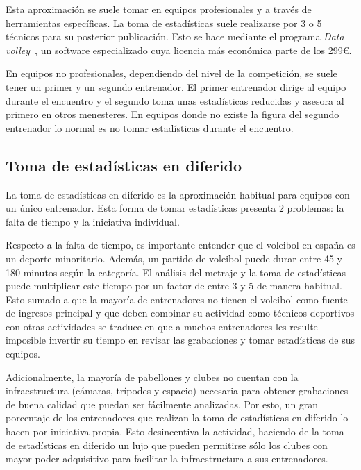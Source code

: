 \documentclass[12pt]{report} %
\begin{document}
    Esta aproximación se suele tomar en equipos profesionales y a través de
    herramientas específicas. La toma de estadísticas suele realizarse por 3 o
    5 técnicos para su posterior publicación. Esto se hace mediante el programa
    \textit{Data volley}~\cite{datavoley}, un software especializado cuya
    licencia más económica parte de los 299\euro. 

    En equipos no profesionales, dependiendo del nivel de la competición, se
    suele tener un primer y un segundo entrenador. El primer entrenador dirige
    al equipo durante el encuentro y el segundo toma unas estadísticas
    reducidas y asesora al primero en otros menesteres. En equipos donde no
    existe la figura del segundo entrenador lo normal es no tomar estadísticas
    durante el encuentro.

    \subsection{Toma de estadísticas en diferido}

    La toma de estadísticas en diferido es la aproximación habitual para
    equipos con un único entrenador. Esta forma de tomar estadísticas presenta
    2 problemas: la falta de tiempo y la iniciativa individual.

    Respecto a la falta de tiempo, es importante entender que el voleibol en
    españa es un deporte minoritario. Además, un partido de voleibol puede durar
    entre 45 y 180 minutos según la categoría. El análisis del metraje y la
    toma de estadísticas puede multiplicar este tiempo por un factor de entre 3
    y 5 de manera habitual. Esto sumado a que la mayoría de entrenadores no
    tienen el voleibol como fuente de ingresos principal y que deben combinar
    su actividad como técnicos deportivos con otras actividades se
    traduce en que a muchos entrenadores les resulte imposible invertir su
    tiempo en revisar las grabaciones y tomar estadísticas de sus equipos.

    Adicionalmente, la mayoría de pabellones y clubes no cuentan con la
    infraestructura (cámaras, trípodes y espacio) necesaria para obtener
    grabaciones de buena calidad que puedan ser fácilmente analizadas. Por esto, 
    un gran porcentaje de los entrenadores que realizan la toma de estadísticas
    en diferido lo hacen por iniciativa propia. Esto desincentiva la actividad,
    haciendo de la toma de estadísticas en diferido un lujo que pueden
    permitirse sólo los clubes con mayor poder adquisitivo para facilitar la
    infraestructura a sus entrenadores.
    
\end{document}
